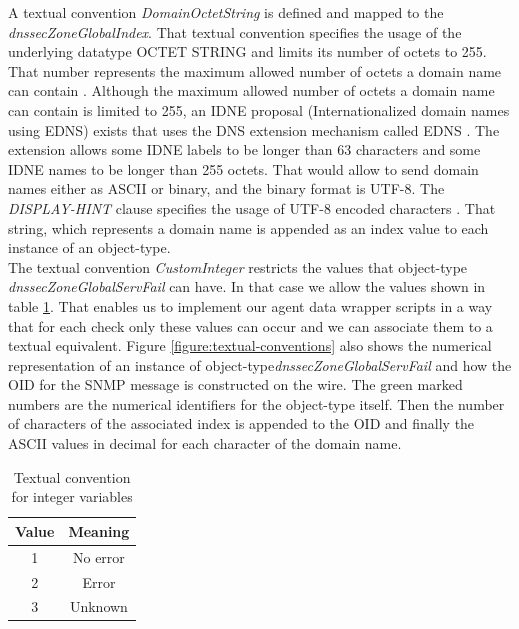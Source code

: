 A textual convention \textit{DomainOctetString} is defined and mapped to the \textit{dnssecZoneGlobalIndex}. That textual convention specifies the usage of the underlying datatype OCTET STRING and limits its number of octets to 255. That number represents the maximum allowed number of octets a domain name can contain \cite{wiki-domainnames}. Although the maximum allowed number of octets a domain name can contain is limited to 255, an IDNE proposal \cite{idne} (Internationalized domain names using EDNS) exists that uses the DNS extension mechanism called EDNS \cite{edns}. The extension allows some IDNE labels to be longer than 63 characters and some IDNE names to be longer than 255 octets. That would allow to send domain names either as ASCII or binary, and the binary format is UTF-8. The \textit{DISPLAY-HINT} clause specifies the usage of UTF-8 encoded characters \cite{smi-tc}. That string, which represents a domain name is appended as an index value to each instance of an object-type.
\\ 
The textual convention \textit{CustomInteger} restricts the values that object-type \textit{dnssecZoneGlobalServFail} can have. In that case we allow the values shown in table \ref{table-tc}. That enables us to implement our agent data wrapper scripts in a way that for each check only these values can occur and we can associate them to a textual equivalent. Figure \ref{figure:textual-conventions} also shows the numerical representation of an instance of object-type\textit{dnssecZoneGlobalServFail} and how the OID for the SNMP message is constructed on the wire. The green marked numbers are the numerical identifiers for the object-type itself. Then the number of characters of the associated index is appended to the OID and finally the ASCII values in decimal for each character of the domain name. 

\begin{table}[h]
   \centering
  \begin{tabular}{|c|c|}
  \hline
  \textbf{Value} & \textbf{Meaning} \\
  \hline
  1 & No error \\
  \hline
  2 & Error \\
  \hline
  3 & Unknown \\
  \hline  
\end{tabular} 
\caption{Textual convention for integer variables }
\label{table-tc}
\end{table}
 
